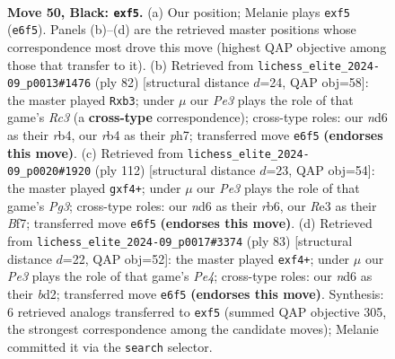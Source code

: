 \documentclass[11pt]{article}
\begin{document}
\clearpage

\begin{figure}[p]\centering
\begin{subfigure}{0.46\textwidth}\centering
\resizebox{\linewidth}{!}{%
\newchessgame
\chessboard[
  setfen={7k/6p1/3Npp2/5P1p/1R1P3P/4r1P1/6K1/8 b - - 0 50},
  showmover=false,
  pgfstyle=straightmove, color=movearrow, markmove={e6-f5}
]}
\caption{}
\end{subfigure}\hfill
\begin{subfigure}{0.46\textwidth}\centering
\resizebox{\linewidth}{!}{%
\newchessgame
\chessboard[
  setfen={8/7p/4k1p1/5p2/1r2p3/1pR3PP/P3KP2/8 w - - 0 42},
  showmover=false,
  pgfstyle=straightmove, color=movearrow, markmove={c3-b3}
]}
\caption{}
\end{subfigure}
\\[4pt]
\begin{subfigure}{0.46\textwidth}\centering
\resizebox{\linewidth}{!}{%
\newchessgame
\chessboard[
  setfen={6R1/5B2/1r4p1/4k2p/4pp1P/6P1/5P2/5K2 w - - 0 57},
  showmover=false,
  pgfstyle=straightmove, color=movearrow, markmove={g3-f4}
]}
\caption{}
\end{subfigure}\hfill
\begin{subfigure}{0.46\textwidth}\centering
\resizebox{\linewidth}{!}{%
\newchessgame
\chessboard[
  setfen={8/4kp2/2r3p1/4p1P1/R1P2P2/6K1/3B4/8 b - - 0 42},
  showmover=false,
  pgfstyle=straightmove, color=movearrow, markmove={e5-f4}
]}
\caption{}
\end{subfigure}
\caption{\textbf{Move 50, Black: \texttt{exf5}.} (a) Our position; Melanie plays \texttt{exf5} (\texttt{e6f5}). Panels (b)--(d) are the retrieved master positions whose correspondence most drove this move (highest QAP objective among those that transfer to it). (b) Retrieved from \texttt{lichess\_elite\_2024-09\_p0013\#1476} (ply 82) [structural distance $d$=24, QAP obj=58]: the master played \texttt{Rxb3}; under $\mu$ our \emph{Pe3} plays the role of that game's \emph{Rc3} (a \textbf{cross-type} correspondence); cross-type roles: our \emph{n}d6 as their \emph{r}b4, our \emph{r}b4 as their \emph{p}h7; transferred move \texttt{e6f5} \textbf{(endorses this move)}. (c) Retrieved from \texttt{lichess\_elite\_2024-09\_p0020\#1920} (ply 112) [structural distance $d$=23, QAP obj=54]: the master played \texttt{gxf4+}; under $\mu$ our \emph{Pe3} plays the role of that game's \emph{Pg3}; cross-type roles: our \emph{n}d6 as their \emph{r}b6, our \emph{R}e3 as their \emph{B}f7; transferred move \texttt{e6f5} \textbf{(endorses this move)}. (d) Retrieved from \texttt{lichess\_elite\_2024-09\_p0017\#3374} (ply 83) [structural distance $d$=22, QAP obj=52]: the master played \texttt{exf4+}; under $\mu$ our \emph{Pe3} plays the role of that game's \emph{Pe4}; cross-type roles: our \emph{n}d6 as their \emph{b}d2; transferred move \texttt{e6f5} \textbf{(endorses this move)}. Synthesis: 6 retrieved analogs transferred to \texttt{exf5} (summed QAP objective 305, the strongest correspondence among the candidate moves); Melanie committed it via the \texttt{search} selector.}
\label{fig:thought-m99}
\end{figure}
\end{document}
